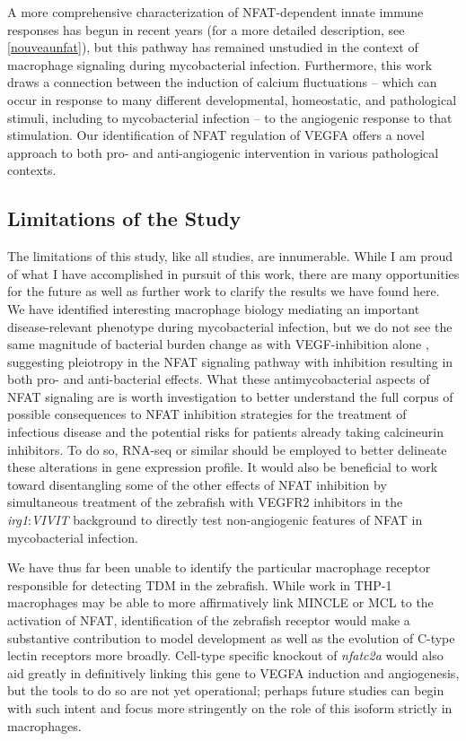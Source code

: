 A more comprehensive characterization of NFAT\hyp{}dependent innate immune responses has begun in recent years \citep{Deerhake2021, Peuker2022, Poli2022} (for a more detailed description, see \autoref{nouveaunfat}), but this pathway has remained unstudied in the context of macrophage signaling during mycobacterial infection. Furthermore, this work draws a connection between the induction of calcium fluctuations -- which can occur in response to many different developmental, homeostatic, and pathological stimuli, including to mycobacterial infection \citep{Kusner2001, Jayachandran2007, Jayachandran2008, Matty2019, Malik2000} -- to the angiogenic response to that stimulation. Our identification of NFAT regulation of VEGFA offers a novel approach to both pro\hyp{} and anti\hyp{}angiogenic intervention in various pathological contexts.

\subsection{Limitations of the Study}

The limitations of this study, like all studies, are innumerable. While I am proud of what I have accomplished in pursuit of this work, there are many opportunities for the future as well as further work to clarify the results we have found here. We have identified interesting macrophage biology mediating an important disease\hyp{}relevant phenotype during mycobacterial infection, but we do not see the same magnitude of bacterial burden change as with VEGF\hyp{}inhibition alone \citep{Oehlers2015}, suggesting pleiotropy in the NFAT signaling pathway with inhibition resulting in both pro\hyp{} and anti\hyp{}bacterial effects. What these antimycobacterial aspects of NFAT signaling are is worth investigation to better understand the full corpus of possible consequences to NFAT inhibition strategies for the treatment of infectious disease and the potential risks for patients already taking calcineurin inhibitors. To do so, RNA\hyp{}seq or similar should be employed to better delineate these alterations in gene expression profile. It would also be beneficial to work toward disentangling some of the other effects of NFAT inhibition by simultaneous treatment of the zebrafish with VEGFR2 inhibitors in the \textit{irg1}:\textit{VIVIT} background to directly test non\hyp{}angiogenic features of NFAT in mycobacterial infection.

We have thus far been unable to identify the particular macrophage receptor responsible for detecting TDM in the zebrafish. While work in THP\hyp{}1 macrophages may be able to more affirmatively link MINCLE or MCL to the activation of NFAT, identification of the zebrafish receptor would make a substantive contribution to model development as well as the evolution of C\hyp{}type lectin receptors more broadly. Cell\hyp{}type specific knockout of \textit{nfatc2a} would also aid greatly in definitively linking this gene to VEGFA induction and angiogenesis, but the tools to do so are not yet operational; perhaps future studies can begin with such intent and focus more stringently on the role of this isoform strictly in macrophages.

